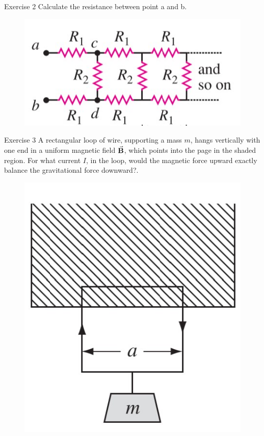\documentclass{beamer}
\begin{document}
\begin{frame}{Exercise 2}
    Calculate the resistance between point a and b.
    \begin{figure}[htbp]
        \centering
        \includegraphics[]{Images/ex2.jpg}    
    \end{figure}

\end{frame}

\begin{frame}{Exercise 3}
    A rectangular loop of wire, supporting a mass $m$, hangs vertically with one end in a uniform magnetic field $\va{B}$, which points into the page in the shaded region. For what current $I$, in the loop, would the magnetic force upward exactly balance the gravitational force downward?.

    \begin{figure}[htbp]
        \centering
        \includegraphics[width=.3\textwidth]{Images/ex3.jpg}
    \end{figure}
\end{frame}
\end{document}
